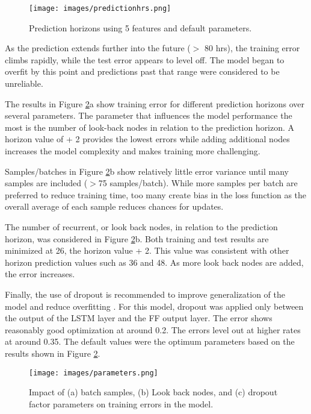 %
\begin{figure}[H]
\centering
\texttt{[image: images/predictionhrs.png]}
\caption{Prediction horizons using 5 features and default parameters.}
\label{fig:predictionhrs}
\end{figure}
%
As the prediction extends further into the future ($>$ 80 hrs), the training error climbs rapidly, while the test error appears to level off. The model began to overfit by this point and predictions past that range were considered to be unreliable.

The results in  Figure \ref{fig:parameters}a show training error for different prediction horizons over several parameters. The parameter that influences the model performance the most is the number of look-back nodes in relation to the prediction horizon. A horizon value of + 2 provides the lowest errors while adding additional nodes increases the model complexity and makes training more challenging. 

Samples/batches in Figure \ref{fig:parameters}b show relatively little error variance until many samples are included ($>$75 samples/batch). While more samples per batch are preferred to reduce training time, too many create bias in the loss function as the overall average of each sample reduces chances for updates.

The number of recurrent, or look back nodes, in relation to the prediction horizon, was considered in  Figure \ref{fig:parameters}b. Both training and test results are minimized at 26, the horizon value + 2. This value was consistent with other horizon prediction values such as 36 and 48. As more look back nodes are added, the error increases.

Finally, the use of dropout is recommended to improve generalization of the model and reduce overfitting \citep{Gal2016}. For this model, dropout was applied only between the output of the LSTM layer and the FF output layer. The error shows reasonably good optimization at around 0.2. The errors level out at higher rates at around 0.35. The default values were the optimum parameters based on the results shown in Figure \ref{fig:parameters}.
%
\begin{figure}[H]
\centering
\texttt{[image: images/parameters.png]}
\caption[Impact of model parameters on training error]{Impact of (a) batch samples, (b) Look back nodes, and (c) dropout factor parameters on training errors in the model.}
\label{fig:parameters}
\end{figure}
%

